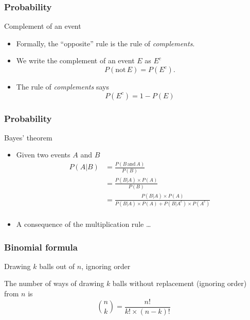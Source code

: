 \documentclass[handout]{beamer}
\begin{document}

   \begin{frame} \frametitle{Probability}

   \begin{block}
   {Complement of an event}
   \begin{itemize}
   \item Formally, the ``opposite'' rule is the rule
   of {\em complements}.
   \item We write the complement of an event $E$ as $E^c$
   $$
   P(\text{not} \, E) = P(E^c).
   $$
   \item The rule of {\em complements} says
   $$
   P(E^c) = 1 - P(E)
   $$
   \end{itemize}
   \end{block}
   \end{frame}


   \begin{frame} \frametitle{Probability}

   \begin{block}
   {Bayes' theorem}
   \begin{itemize}
   \item Given two events $A$ and $B$
   $$
   \begin{aligned}
   P(A|B) &= \frac{P(B \, \text{and} \,  A)}{P(B)} \\
   &= \frac{P(B|A)\times P(A)}{P(B)} \\
   &= \frac{P(B|A) \times P(A)}{P(B|A) \times P(A) + P(B|A^c) \times P(A^c)     } \\
   \end{aligned}
   $$
   \item A consequence of the multiplication rule \dots

   \end{itemize}
   \end{block}
   \end{frame}


   \begin{frame} \frametitle{Binomial formula}

   \begin{block}
   {Drawing $k$ balls out of $n$, ignoring order}

   The number of ways of drawing $k$ balls without replacement (ignoring order)
   from $n$ is
   $$
   \binom{n}{k} = \frac{n!}{k! \times (n-k)!}
   $$
   \end{block}
   \end{frame}
\end{document}
